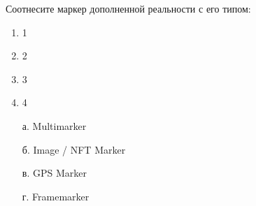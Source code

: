
Соотнесите маркер дополненной реальности с его типом:


\begin{multicols}{2}
    {
        \begin{enumerate}
            \item 1
            \item 2
            \item 3
            \item 4
        \end{enumerate}
    }    
    {
        \begin{enumerate}
            \item[а.] Multimarker
            \item[б.] Image / NFT Marker
            \item[в.] GPS Marker
            \item[г.] Framemarker
        \end{enumerate}
    }
\end{multicols}

